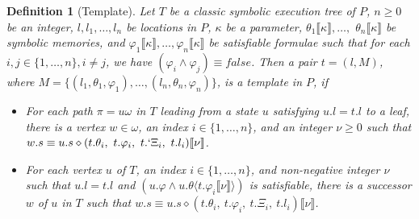 \documentclass{sig-alternate}%
\newtheorem{dfn}{Definition}%
\newcommand{\false}{\ensuremath{\mathit{false}}}
\newcommand{\prm}[1]{\ensuremath{\llbracket #1 \rrbracket}}
\newcommand{\ese}[1]{\ensuremath{\langle #1 \rangle}}
\newcommand{\compose}{\ensuremath{\diamond}}
\begin{document}
\begin{dfn}[Template] \label{def:LoopTemplate} Let $T$ be a classic symbolic
  execution tree of $P$, $n\ge0$ be an integer, $l, l_1, \ldots, l_n$ be
  locations in $P$, $\kappa$ be a parameter, $\theta_1\prm{\kappa}, \ldots,$
  $\theta_n\prm{\kappa}$ be symbolic memories, and $\varphi_1\prm{\kappa},
  \ldots, \varphi_n\prm{\kappa}$ be satisfiable formulae such that for each
  $i,j \in \{ 1, \ldots, n \}, i \neq j$, we have $(\varphi_i \wedge
  \varphi_j) \equiv \false$.  Then a pair $t = (l,M)$, where $M =
  \{(l_1,\theta_1,\varphi_1), \ldots, (l_n,\theta_n,\varphi_n)\}$, is a
  \emph{template} in $P$, if
  \begin{itemize}
  \item[(L1)] For each path $\pi = u \omega$ in $T$ leading from a state $u$
    satisfying $u.l = t.l$ to a leaf, there is a vertex $w \in \omega$, an
    index $i \in \{ 1, \ldots, n \}$, and an integer $\nu \geq 0$ such that
    $w.s \equiv u.s \compose 
    (t.\theta_i,~t.\varphi_i,~t.`\Xi_i,~t.l_i)\prm{\nu}$.
  \item[(L2)] For each vertex $u$ of $T$, an index $i \in \{ 1, \ldots, n
    \}$, and non-negative integer $\nu$ such that $u.l = t.l$ and
    $(u.\varphi \wedge u.\theta\ese{t.\varphi_i\prm{\nu}})$ is satisfiable,
    there is a successor $w$ of $u$ in $T$ such that $w.s \equiv u.s
    \compose (t.\theta_i,~t.\varphi_i,~t.\Xi_i,~t.l_i)\prm{\nu}$.
  \end{itemize}
\end{dfn}
\end{document}
